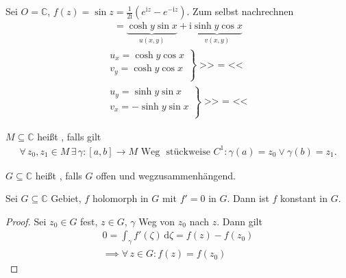 \begin{example}
  Sei $O = \mathbb{C}$, $f(z) = \sin z = \frac{1}{2 \mathrm{i}} \left( e^{\mathrm{i} z} - e^{-\mathrm{i} z} \right)$. Zum selbst nachrechnen
  \begin{align*}
    = \underbrace{\cosh y \sin x}_{u(x,y)} + \mathrm{i} \underbrace{\sinh y \cos x}_{v(x,y)}
  \end{align*}
  \begin{align*}
    \left.
    \begin{matrix}
      u_x = \cosh y \cos x \\
      v_y = \cosh y \cos x \\
    \end{matrix}
    \right\} \text{>> $=$ <<}
    \\
    \left.
    \begin{matrix}
      u_y = \sinh y \sin x \\
      v_x = - \sinh y \sin x \\
    \end{matrix}
    \right\} \text{>> $=$ <<}
  \end{align*}
\end{example}

\begin{theorem}[Definition]
  \begin{enum-arab}
    \item $M \subseteq \mathbb{C}$ heißt , falls gilt
    \begin{align*}
      \forall \, z_0,z_1 \in M \, \exists \, \gamma:[a,b] \to M \text{ Weg } \text{ stückweise } C^1 : \gamma(a) = z_0 \lor \gamma(b) = z_1.
    \end{align*}
    \item $G \subseteq \mathbb{C}$ heißt , falls $G$ offen und wegzusammenhängend.
  \end{enum-arab}
\end{theorem}

\begin{theorem}[Satz]
  Sei $G \subseteq \mathbb{C}$ Gebiet, $f$ holomorph in $G$ mit $f' = 0$ in $G$. Dann ist $f$ konstant in $G$.
  
  \begin{proof}
    Sei $z_0 \in G$ fest, $z \in G$, $\gamma$ Weg von $z_0$ nach $z$.
    Dann gilt
    \begin{gather*}
      0 = \int_{\gamma} f'(\zeta) \, \mathrm{d}\zeta = f(z) - f(z_0) \\
      \implies \forall \, z \in G : f(z) = f(z_0)
    \end{gather*}
  \end{proof}
\end{theorem}

